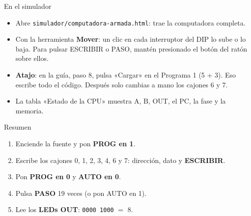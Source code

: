 \documentclass[aspectratio=169,11pt]{beamer}
\begin{document}
\begin{frame}{En el simulador}
  \begin{itemize}
    \item Abre \texttt{simulador/computadora-armada.html}: trae la computadora completa.
    \item Con la herramienta \textbf{Mover}: un clic en cada interruptor del DIP lo sube o lo baja. Para pulsar ESCRIBIR o PASO, mantén presionado el botón del ratón sobre ellos.
    \item \textbf{Atajo}: en la guía, paso 8, pulsa «Cargar» en el Programa 1 (5 + 3). Eso escribe todo el código. Después solo cambias a mano los cajones 6 y 7.
    \item La tabla «Estado de la CPU» muestra A, B, OUT, el PC, la fase y la memoria.
  \end{itemize}
\end{frame}

\begin{frame}{Resumen}
  \begin{enumerate}
    \item Enciende la fuente y pon \textbf{PROG en 1}.
    \item Escribe los cajones 0, 1, 2, 3, 4, 6 y 7: dirección, dato y \textbf{ESCRIBIR}.
    \item Pon \textbf{PROG en 0} y \textbf{AUTO en 0}.
    \item Pulsa \textbf{PASO} 19 veces (o pon AUTO en 1).
    \item Lee los \textbf{LEDs OUT}: \texttt{0000 1000} $=$ 8.
  \end{enumerate}
  \vfill
  \centering
\end{frame}
\end{document}
